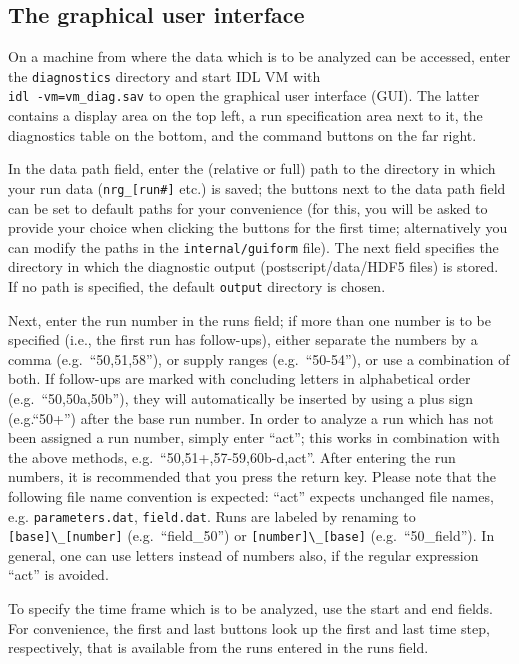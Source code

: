 \documentclass[12pt]{article}
\begin{document}
\subsection{The graphical user interface}

On a machine from where the data which is to be analyzed can be
accessed, enter the \verb|diagnostics| directory and start IDL VM with \\
{\tt idl -vm=vm\_diag.sav} to open the graphical user interface (GUI).
The latter contains a display area on the top left, a run
specification area next to it, the diagnostics table on the bottom,
and the command buttons on the far right.

In the data path field, enter the (relative or full) path
to the directory in which your run data (\verb|nrg_[run#]| etc.) is saved; the buttons next
to the data path field can be set to default paths for your
convenience (for this, you will be asked to provide your choice
when clicking the buttons for the first time; alternatively you
can modify the paths in the \verb|internal/guiform| file).
The next field specifies the directory in which the diagnostic output
(postscript/data/HDF5 files)
is stored. If no path is specified, the default \verb|output|
directory is chosen.

Next, enter the run number in the runs field; if more than one
number is to be specified (i.e., the first run has follow-ups),
either separate the numbers by a comma (e.g.~``50,51,58''), or
supply ranges (e.g.~``50-54''), or use a combination of both.
If follow-ups are marked with concluding letters in
alphabetical order (e.g.~``50,50a,50b''), they will automatically
be inserted by using a plus sign (e.g.``50+'') after the base
run number. In
order to analyze a run which has not been assigned a run number,
simply enter ``act''; this works in combination with the above
methods, e.g.~``50,51+,57-59,60b-d,act''. After entering the run
numbers, it is recommended that you press the return key. Please
note that the following file name convention is expected: ``act''
expects unchanged file names, e.g. \verb|parameters.dat|,
\verb|field.dat|. Runs are labeled by renaming to
\verb|[base]\_[number]| (e.g.~``field\_50'') or
\verb|[number]\_[base]| (e.g.~``50\_field''). In general, one can
use letters instead of numbers also, if the regular expression
``act'' is avoided.

To specify the time frame which is to be analyzed, use the start
and end fields. For convenience, the first and last buttons look
up the first and last time step, respectively, that is available
from the runs entered in the runs field.
\end{document}
